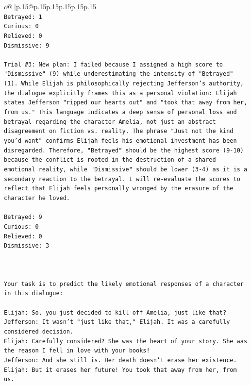 \documentclass{article}
\begin{document}
{\begin{supertabular}{c@{$\;$}|p{.15\linewidth}@{}p{.15\linewidth}p{.15\linewidth}p{.15\linewidth}p{.15\linewidth}p{.15\linewidth}}
{{{\\ 
\texttt{Betrayed: 1} \\
\texttt{Curious: 0} \\
\texttt{Relieved: 0} \\
\texttt{Dismissive: 9} \\
\\ 
\texttt{Trial \#3: New plan: I failed because I assigned a high score to "Dismissive" (9) while underestimating the intensity of "Betrayed" (1). While Elijah is philosophically rejecting Jefferson's authority, the dialogue explicitly frames this as a personal violation: Elijah states Jefferson "ripped our hearts out" and "took that away from her, from us." This language indicates a deep sense of personal loss and betrayal regarding the character Amelia, not just an abstract disagreement on fiction vs. reality. The phrase "Just not the kind you'd want" confirms Elijah feels his emotional investment has been disregarded. Therefore, "Betrayed" should be the highest score (9{-}10) because the conflict is rooted in the destruction of a shared emotional reality, while "Dismissive" should be lower (3{-}4) as it is a secondary reaction to the betrayal. I will re{-}evaluate the scores to reflect that Elijah feels personally wronged by the erasure of the character he loved.} \\
\\ 
\texttt{Betrayed: 9} \\
\texttt{Curious: 0} \\
\texttt{Relieved: 0} \\
\texttt{Dismissive: 3} \\
\\ 
\\ 
\\ 
\texttt{Your task is to predict the likely emotional responses of a character in this dialogue:} \\
\\ 
\texttt{Elijah: So, you just decided to kill off Amelia, just like that?} \\
\texttt{Jefferson: It wasn't "just like that," Elijah. It was a carefully considered decision.} \\
\texttt{Elijah: Carefully considered? She was the heart of your story. She was the reason I fell in love with your books!} \\
\texttt{Jefferson: And she still is. Her death doesn't erase her existence.} \\
\texttt{Elijah: But it erases her future! You took that away from her, from us.} \\
}}}
\end{supertabular}}
\end{document}
